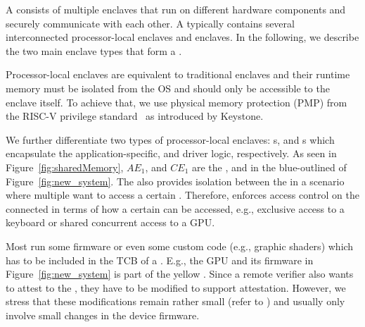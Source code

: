 A \nameenclave{} consists of multiple enclaves that run on different hardware components and securely communicate with each other. A \nameenclave{} typically contains several interconnected processor-local enclaves and \sphw enclaves. In the following, we describe the two main enclave types that form a \nameenclave{}.

\label{sec:overview:enclaves:processorEnclave}

Processor-local enclaves are equivalent to traditional enclaves and their runtime memory must be isolated from the OS and should only be accessible to the enclave itself. To achieve that, we use physical memory protection (PMP) from the RISC-V privilege standard~\cite{riscv2019privspec} as introduced by Keystone.

We further differentiate two types of processor-local enclaves: \app{}s, and \ce{}s which encapsulate the application-specific, and driver logic, respectively. As seen in Figure~\ref{fig:sharedMemory}, $AE_1$, and $CE_1$ are the \app, and \ce in the blue-outlined \nameenclave of Figure~\ref{fig:new_system}. The \ce also provides isolation between the \apps in a scenario where multiple \apps want to access a certain \sphw. Therefore, \ce enforces access control on the connected \apps in terms of how a certain \sphw can be accessed, e.g., exclusive access to a keyboard or shared concurrent access to a GPU. 

\label{sec:overview:enclaves:peripheralEnclave}
Most \sphw run some firmware or even some custom code (e.g., graphic shaders) which has to be included in the TCB of a \nameenclave.
E.g., the GPU and its firmware in Figure~\ref{fig:new_system} is part of the yellow \nameenclave. Since a remote verifier also wants to attest to the \sphw, they have to be modified to support attestation. However, we stress that these modifications  remain rather small (refer to ) and usually only involve small changes in the device firmware. %


